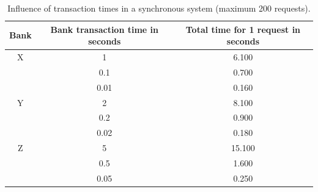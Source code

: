 \documentclass[10pt,a4paper,twocolumn]{article}
\begin{document}
\begin{center}
	\begin{table}[]
		\begin{tabular}{c|c|c}
			Bank				& Bank transaction time in seconds & Total time for 1 request in seconds\\\hline
			X					 & 1 						  & 6.100 \\
			& 0.1 						& 0.700 \\
			& 0.01 					   & 0.160 \\\hline
			Y				   & 2 							& 8.100 \\
			& 0.2 						&  0.900\\
			& 0.02 					   & 0.180 \\\hline
			Z				   & 5 							& 15.100 \\
			& 0.5 						&  1.600\\
			& 0.05 					   & 0.250
		\end{tabular}
		\caption{\label{tab:banking-time-influence-synchronous}Influence of transaction times in a synchronous system (maximum 200 requests).}
	\end{table}
\end{center}

\noindent
\end{document}
